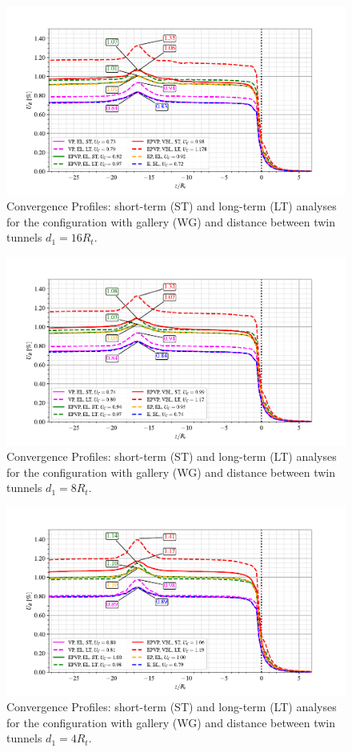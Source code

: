 \documentclass[a4paper,fleqn]{cas-sc}
\begin{document}
\begin{figure}[h!]
	\centering
	\includegraphics[scale=0.9]{Convergence Profiles - WG_ST_LT - $d_1=16R_i$_anotate.pdf}
	\caption{Convergence Profiles: short-term (ST) and long-term (LT) analyses for the configuration with gallery (WG) and distance between twin tunnels $d_1 = 16R_t$.}
	\label{WG-ST-LT-D1-16RI}
\end{figure}
\FloatBarrier
\begin{figure}[h!]
	\centering
	\includegraphics[scale=0.9]{Convergence Profiles - WG_ST_LT - $d_1=8R_i$_anotate.pdf}
	\caption{
		Convergence Profiles: short-term (ST) and long-term (LT) analyses for the configuration with gallery (WG) and distance between twin tunnels $d_1 = 8R_t$.}
	\label{WG-ST-LT-D1-8RI}
\end{figure}
\FloatBarrier
\begin{figure}[h!]
	\centering
	\includegraphics[scale=0.9]{Convergence Profiles - WG_ST_LT - $d_1=4R_i$_anotate.pdf}
	\caption{Convergence Profiles: short-term (ST) and long-term (LT) analyses for the configuration with gallery (WG) and distance between twin tunnels $d_1 = 4R_t$.}
	\label{WG-ST-LT-D1-4RI}
\end{figure}
\end{document}
